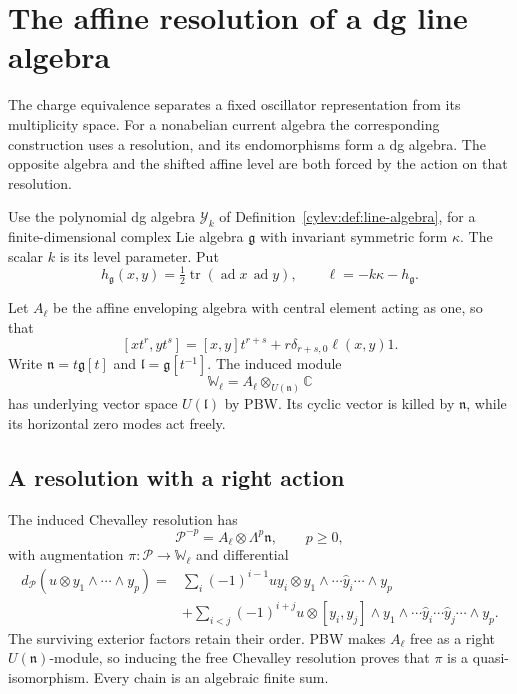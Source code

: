 \section{The affine resolution of a dg line algebra}

The charge equivalence separates a fixed oscillator representation
from its multiplicity space. For a nonabelian current algebra the
corresponding construction uses a resolution, and its endomorphisms
form a dg algebra. The opposite algebra and the shifted affine level
are both forced by the action on that resolution.

Use the polynomial dg algebra $\mathcal Y_k$ of
Definition~\ref{cylev:def:line-algebra}, for a finite-dimensional
complex Lie algebra $\mathfrak g$ with invariant symmetric form
$\kappa$. The scalar $k$ is its level parameter. Put
\[
 h_{\mathfrak g}(x,y)=\tfrac12\operatorname{tr}
                  (\operatorname{ad}x\,\operatorname{ad}y),
 \qquad \ell=-k\kappa-h_{\mathfrak g}.
\]

Let $A_\ell$ be the affine enveloping algebra with central element
acting as one, so that
\begin{equation}\label{cyrec:eq:affine}
 [xt^r,yt^s]=[x,y]t^{r+s}
                      +r\delta_{r+s,0}\ell(x,y)1.
\end{equation}
Write $\mathfrak n=t\mathfrak g[t]$ and
$\mathfrak l=\mathfrak g[t^{-1}]$. The induced module
\[
 \mathbb W_\ell=A_\ell\otimes_{U(\mathfrak n)}\mathbb C
\]
has underlying vector space $U(\mathfrak l)$ by PBW. Its cyclic
vector is killed by $\mathfrak n$, while its horizontal zero modes
act freely.

\subsection{A resolution with a right action}

The induced Chevalley resolution has
\begin{equation}\label{cyrec:eq:affine-resolution}
 \mathcal P^{-p}=A_\ell\otimes\Lambda^p\mathfrak n,
 \qquad p\geq0,
\end{equation}
with augmentation $\pi:\mathcal P\to\mathbb W_\ell$ and
differential
\begin{align}
 d_{\mathcal P}(u\otimes y_1\wedge\cdots\wedge y_p)
 ={}&\sum_i(-1)^{i-1}uy_i\otimes
              y_1\wedge\cdots\widehat y_i\cdots\wedge y_p
 \nonumber\\
 &+\sum_{i<j}(-1)^{i+j}u\otimes[y_i,y_j]\wedge
              y_1\wedge\cdots\widehat y_i\cdots\widehat y_j
                       \cdots\wedge y_p.
 \label{cyrec:eq:chevalley-differential}
\end{align}
The surviving exterior factors retain their order. PBW makes
$A_\ell$ free as a right $U(\mathfrak n)$-module, so inducing the
free Chevalley resolution proves that $\pi$ is a quasi-isomorphism.
Every chain is an algebraic finite sum.

